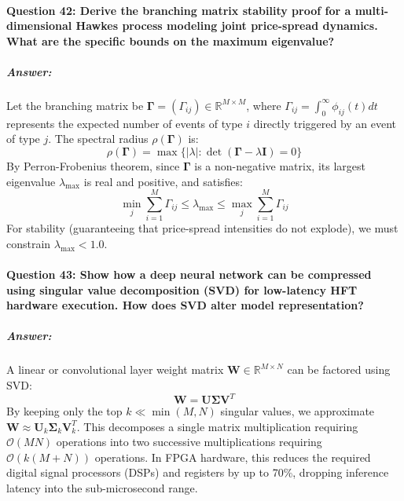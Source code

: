 \documentclass[11pt,a4paper]{article}
\begin{document}
\paragraph{Question 42: Derive the branching matrix stability proof for a multi-dimensional Hawkes process modeling joint price-spread dynamics. What are the specific bounds on the maximum eigenvalue?}
\subparagraph{Answer:}
Let the branching matrix be $\mathbf{\Gamma} = (\Gamma_{ij}) \in \mathbb{R}^{M \times M}$, where $\Gamma_{ij} = \int_0^\infty \phi_{ij}(t) dt$ represents the expected number of events of type $i$ directly triggered by an event of type $j$. The spectral radius $\rho(\mathbf{\Gamma})$ is:
\begin{equation}
    \rho(\mathbf{\Gamma}) = \max \{ |\lambda| : \det(\mathbf{\Gamma} - \lambda \mathbf{I}) = 0 \}
\end{equation}
By Perron-Frobenius theorem, since $\mathbf{\Gamma}$ is a non-negative matrix, its largest eigenvalue $\lambda_{\max}$ is real and positive, and satisfies:
\begin{equation}
    \min_j \sum_{i=1}^M \Gamma_{ij} \leq \lambda_{\max} \leq \max_j \sum_{i=1}^M \Gamma_{ij}
\end{equation}
For stability (guaranteeing that price-spread intensities do not explode), we must constrain $\lambda_{\max} < 1.0$.

\paragraph{Question 43: Show how a deep neural network can be compressed using singular value decomposition (SVD) for low-latency HFT hardware execution. How does SVD alter model representation?}
\subparagraph{Answer:}
A linear or convolutional layer weight matrix $\mathbf{W} \in \mathbb{R}^{M \times N}$ can be factored using SVD:
\begin{equation}
    \mathbf{W} = \mathbf{U} \mathbf{\Sigma} \mathbf{V}^T
\end{equation}
By keeping only the top $k \ll \min(M, N)$ singular values, we approximate $\mathbf{W} \approx \mathbf{U}_k \mathbf{\Sigma}_k \mathbf{V}_k^T$. This decomposes a single matrix multiplication requiring $\mathcal{O}(MN)$ operations into two successive multiplications requiring $\mathcal{O}(k(M + N))$ operations. In FPGA hardware, this reduces the required digital signal processors (DSPs) and registers by up to 70\%, dropping inference latency into the sub-microsecond range.
\end{document}
